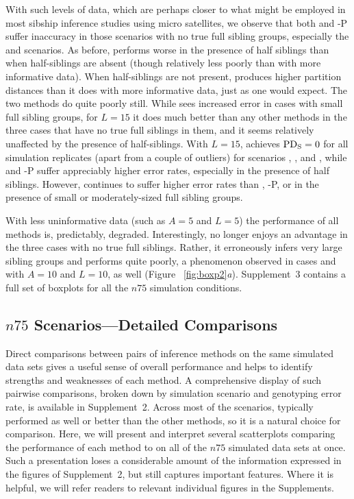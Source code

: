 With such levels of data, which are perhaps closer to what might be employed in most sibship inference 
studies using micro satellites, we observe that both \colony{} and \colony{}-P suffer inaccuracy in those scenarios with 
no true full sibling groups, especially the \allhalf{} and \allpathalf{} scenarios.  As before, 
\familyfinder{} performs worse in the presence of half siblings than when half-siblings are absent (though 
relatively less poorly than with more informative data).  When half-siblings are not present, 
\familyfinder{} produces higher partition distances than it does with more informative data, just as 
one would expect.  The two \kinalyzer{} methods do quite poorly still. While \prt{} sees increased 
error in cases with small full sibling groups, for $L=15$ it does much better than any other methods in 
the three cases that have no true full siblings in them, and it seems relatively unaffected by the 
presence of half-siblings. With $L=15$, \prt{} achieves $\mathrm{PD_S}=0$ for all simulation replicates (apart 
from a couple of outliers) for scenarios \nosibs{}, \allhalf{}, and \allpathalf{}, while \colony{} and 
\colony{}-P suffer appreciably higher error rates, especially in the presence of half siblings. 
However, \prt{} continues to suffer higher error rates than \colony{}, \colony{}-P, or \familyfinder{} 
in the presence of small or moderately-sized full sibling groups.

With less uninformative data (such as $A=5$ and $L=5$) the performance of all methods is, predictably, 
degraded.  Interestingly, \prt{} no longer enjoys an advantage in the three cases with no true full 
siblings.  Rather, it erroneously infers very large sibling groups and performs quite poorly, a 
phenomenon observed in cases \allhalf{} and \allpathalf{} with $A=10$ and $L=10$, as well (Figure~
\ref{fig:boxp2}{\em a}).  Supplement~3 contains a full set of boxplots for all the $n75$ simulation 
conditions.

\subsection*{$n75$ Scenarios---Detailed Comparisons}
Direct comparisons between pairs of inference methods on the same simulated data sets gives a useful 
sense of overall performance and helps to identify strengths and weaknesses of each method. A 
comprehensive display of such pairwise comparisons, broken down by simulation scenario and genotyping 
error rate, is available in Supplement~2. Across most of the scenarios, \colony{} typically performed 
as well or better than the other methods, so it is a natural choice for comparison.
Here, we will present and interpret several scatterplots comparing the performance of each method to 
\colony{} on all of the $n75$ simulated data sets at once.  Such a presentation loses a considerable 
amount of the information expressed in the figures of Supplement~2, but still captures important 
features.  Where it is helpful, we will refer readers to relevant individual figures in the 
Supplements.

